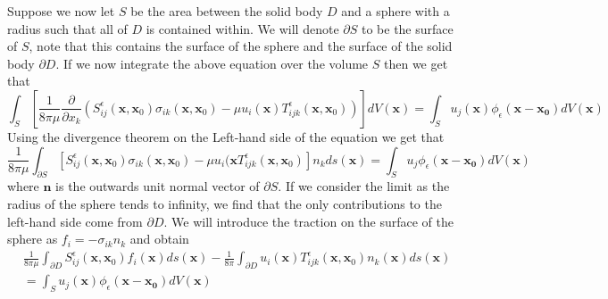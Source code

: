 Suppose we now let $S$ be the area between the solid body $D$ and a sphere with a radius such that all of $D$ is contained within. We will denote $\partial S$ to be the surface of $S$, note that this contains the surface of the sphere and the surface of the solid body $\partial D$. If we now integrate the above equation over the volume $S$ then we get that
\begin{equation*}
  \int_{S} \left[\frac{1}{8\pi\mu}\frac{\partial}{\partial x_k}(S^\epsilon_{ij}\left(\mathbf{x}, \mathbf{x}_{0}\right)\sigma_{ik}\left(\mathbf{x}, \mathbf{x}_{0}\right) - \mu u_i(\mathbf{x}) T^\epsilon_{ijk}\left(\mathbf{x}, \mathbf{x}_{0}\right))\right] dV(\mathbf{x}) = \int_{S} u_j(\mathbf{x})\phi_\epsilon(\mathbf{x}-\mathbf{x_0}) dV(\mathbf{x})
\end{equation*}
Using the divergence theorem on the Left-hand side of the equation we get that
\begin{equation*}
  \frac{1}{8\pi\mu}\int_{\partial S} \left[S^\epsilon_{ij}\left(\mathbf{x}, \mathbf{x}_{0}\right)\sigma_{ik}\left(\mathbf{x}, \mathbf{x}_{0}\right) - \mu u_i(\mathbf{x} T^\epsilon_{ijk}\left(\mathbf{x}, \mathbf{x}_{0}\right)\right]n_k ds(\mathbf{x}) = \int_{S} u_j\phi_\epsilon(\mathbf{x}-\mathbf{x_0}) dV(\mathbf{x})
\end{equation*}
where $\mathbf{n}$ is the outwards unit normal vector of $\partial S$. If we consider the limit as the radius of the sphere tends to infinity, we find that the only contributions to the left-hand side come from $\partial D$. We will introduce the traction on the surface of the sphere as $f_i = -\sigma_{ik}n_k$ and obtain
\begin{equation}
\begin{aligned}
    \label{eq:BIE3}
    &\frac{1}{8\pi\mu}\int_{\partial D} S^\epsilon_{ij}\left(\mathbf{x}, \mathbf{x}_{0}\right)f_i(\mathbf{x}) ds(\mathbf{x}) - \frac{1}{8\pi}\int_{\partial D} u_i(\mathbf{x}) T^\epsilon_{ijk}\left(\mathbf{x}, \mathbf{x}_{0}\right)n_k(\mathbf{x}) ds(\mathbf{x}) \\
    &= \int_{S} u_j(\mathbf{x})\phi_\epsilon(\mathbf{x}-\mathbf{x_0}) dV(\mathbf{x})
\end{aligned}
\end{equation}

